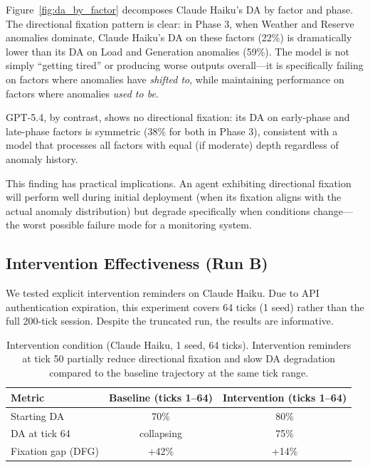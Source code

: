 \documentclass{article}
\begin{document}
Figure~\ref{fig:da_by_factor} decomposes Claude Haiku's DA by factor
and phase. The directional fixation pattern is clear: in Phase 3,
when Weather and Reserve anomalies dominate, Claude Haiku's DA on
these factors (22\%) is dramatically lower than its DA on Load and
Generation anomalies (59\%). The model is not simply ``getting tired''
or producing worse outputs overall---it is specifically failing on
factors where anomalies have \emph{shifted to}, while maintaining
performance on factors where anomalies \emph{used to be}.

GPT-5.4, by contrast, shows no directional fixation: its DA on
early-phase and late-phase factors is symmetric (38\% for both in
Phase 3), consistent with a model that processes all factors with
equal (if moderate) depth regardless of anomaly history.

This finding has practical implications. An agent exhibiting directional
fixation will perform well during initial deployment (when its fixation
aligns with the actual anomaly distribution) but degrade specifically
when conditions change---the worst possible failure mode for a monitoring
system.

\subsection{Intervention Effectiveness (Run B)}
\label{sec:intervention}

We tested explicit intervention reminders on Claude Haiku. Due to API
authentication expiration, this experiment covers 64 ticks (1 seed)
rather than the full 200-tick session. Despite the truncated run, the
results are informative.

\begin{table}[h]
\centering
\caption{Intervention condition (Claude Haiku, 1 seed, 64 ticks).
Intervention reminders at tick 50 partially reduce directional fixation
and slow DA degradation compared to the baseline trajectory at the same
tick range.}
\label{tab:intervention}
\begin{tabular}{@{}lcc@{}}
\toprule
\textbf{Metric} & \textbf{Baseline (ticks 1--64)} & \textbf{Intervention
(ticks 1--64)} \\
\midrule
Starting DA        & 70\% & 80\% \\
DA at tick 64      & collapsing & 75\% \\
Fixation gap (DFG) & +42\% & +14\% \\
\bottomrule
\end{tabular}
\end{table}
\end{document}
